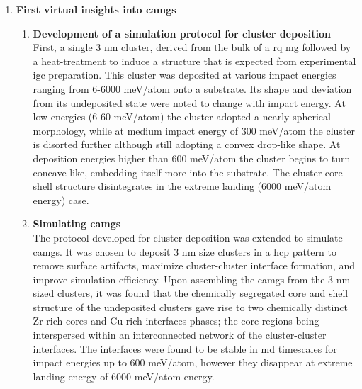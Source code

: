 \begin{enumerate}[leftmargin=*]
\item \textbf{First virtual insights into \gls{camg}s}
\begin{enumerate}[leftmargin=*]

\item \textbf{Development of a simulation protocol for cluster deposition} \\
First, a single 3 nm cluster, derived from the bulk of a \gls{rq} \gls{mg} followed by a heat-treatment to induce a structure that is expected from experimental \gls{igc} preparation. This cluster was deposited at various impact energies ranging from 6-6000 meV/atom onto a \cz substrate. Its shape and deviation from its undeposited state were noted to change with impact energy. At low energies (6-60 meV/atom) the cluster adopted a nearly spherical morphology, while at medium impact energy of 300 meV/atom the cluster is disorted further although still adopting a convex drop-like shape. At deposition energies higher than 600 meV/atom the cluster begins to turn concave-like, embedding itself more into the substrate. The cluster core-shell structure disintegrates in the extreme landing (6000 meV/atom energy) case. \par

\item \textbf{Simulating \cz \gls{camg}s} \\
The protocol developed for cluster deposition was extended to simulate \gls{camg}s. It was chosen to deposit 3 nm size \cz clusters in a \gls{hcp} pattern to remove surface artifacts, maximize cluster-cluster interface formation, and improve simulation efficiency. Upon assembling the \gls{camg}s from the 3 nm sized clusters, it was found that the chemically segregated core and shell structure of the undeposited clusters gave rise to two chemically distinct Zr-rich cores and Cu-rich interfaces phases; the core regions being interspersed within an interconnected network of the cluster-cluster interfaces. The interfaces were found to be stable in \gls{md} timescales for impact energies up to 600 meV/atom, however they disappear at extreme landing energy of 6000 meV/atom energy. \par


\end{enumerate}
\end{enumerate}
